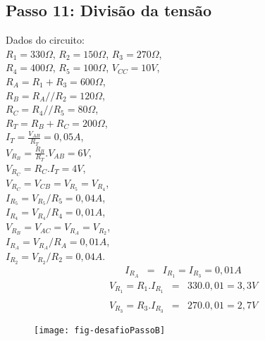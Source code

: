 \subsection{Passo 11: Divisão da tensão}

\begin{minipage}{\linewidth}
  \centering
  \begin{minipage}{0.45\linewidth}
    Dados do circuito: \\
                $R_1 = 330\Omega$,
                $R_2 = 150\Omega$,
                $R_3 = 270\Omega$, \\
                $R_4 = 400\Omega$,
                $R_5 = 100\Omega$,
                $V_{CC} = 10V$, \\
                $R_A = R_1 + R_3 = 600\Omega$, \\
                $R_B = R_A // R_2 = 120\Omega$, \\
                $R_C = R_4 // R_5 = 80\Omega$, \\
                $R_T = R_B + R_C = 200\Omega$, \\
                \color{blue}
                $I_T = \frac{V_{AB}}{R_T} = 0,05 A$,\\
                \color{red}
                $V_{R_B} = \frac{R_B}{R_T} . V_{AB} = 6V$,\\
                $V_{R_C} = R_C.I_T = 4V$, \\
                $V_{R_C} = V_{CB} = V_{R_5} = V_{R_4}$,\\
                \color{blue}
                $I_{R_5} = V_{R_5} / R_5 = 0,04 A $, \\
                $I_{R_4} = V_{R_4} / R_4 = 0,01 A$, \\
                \color{red}
                $V_{R_B} = V_{AC} = V_{R_A} = V_{R_2}$, \\
                \color{blue}
                $I_{R_A} = V_{R_A} / R_A = 0,01 A$, \\
                $I_{R_2} = V_{R_2} / R_2 = 0,04 A$.
    \begin{eqnarray}
      I_{R_A} & = & I_{R_1} = I_{R_3} = 0,01 A \nonumber
    \end{eqnarray}
    \color{red}
    \vspace{-10mm}
    \begin{eqnarray}
      V_{R_1} = R_1 . I_{R_1} & = & 330 . 0,01 = 3,3 V \nonumber\\
      \nonumber\\
      V_{R_3} = R_3 . I_{R_3} & = & 270 . 0,01 = 2,7 V \nonumber
    \end{eqnarray}
  \end{minipage}
  \hspace{0.05\linewidth}
  \begin{minipage}{0.45\linewidth}
    \begin{figure}[H]
      \centering
      \texttt{[image: fig-desafioPassoB]}
    \end{figure}
  \end{minipage}
\end{minipage}







